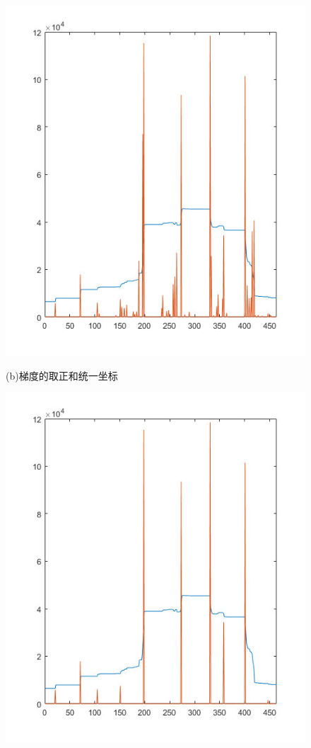 \begin{figure}[htbp]
\begin{minipage}[t]{0.32\linewidth}
        \includegraphics[width=\textwidth]{./figures/c4_unified.jpg}
        \centerline{\small (b)梯度的取正和统一坐标}
        \end{minipage}
        \begin{minipage}[t]{0.32\linewidth}
        \centering
        \includegraphics[width=\textwidth]{./figures/c4_nms.jpg}

\end{minipage}
\end{figure}
